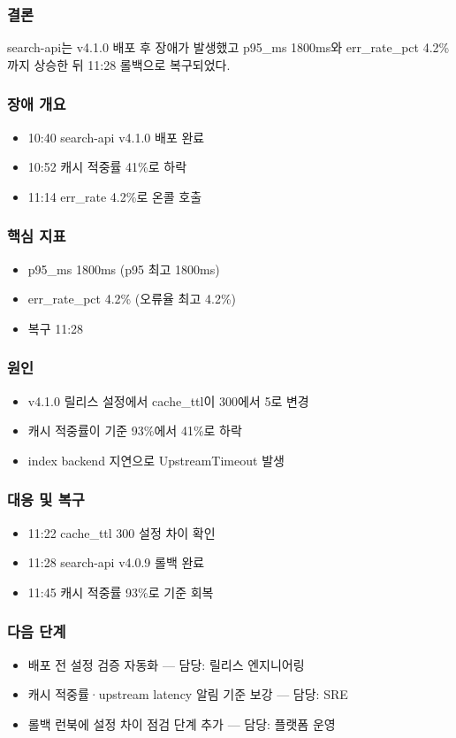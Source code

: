 \documentclass[aspectratio=169]{beamer}
\begin{document}
\begin{frame}
\frametitle{결론}
\centering
search-api는 v4.1.0 배포 후 장애가 발생했고 p95\_ms 1800ms와 err\_rate\_pct 4.2\%까지 상승한 뒤 11:28 롤백으로 복구되었다.
\end{frame}

\begin{frame}
\frametitle{장애 개요}
\begin{itemize}
  \item 10:40 search-api v4.1.0 배포 완료
  \item 10:52 캐시 적중률 41\%로 하락
  \item 11:14 err\_rate 4.2\%로 온콜 호출
\end{itemize}
\end{frame}

\begin{frame}
\frametitle{핵심 지표}
\begin{itemize}
  \item p95\_ms 1800ms (p95 최고 1800ms)
  \item err\_rate\_pct 4.2\% (오류율 최고 4.2\%)
  \item 복구 11:28
\end{itemize}
\end{frame}

\begin{frame}
\frametitle{원인}
\begin{itemize}
  \item v4.1.0 릴리스 설정에서 cache\_ttl이 300에서 5로 변경
  \item 캐시 적중률이 기준 93\%에서 41\%로 하락
  \item index backend 지연으로 UpstreamTimeout 발생
\end{itemize}
\end{frame}

\begin{frame}
\frametitle{대응 및 복구}
\begin{itemize}
  \item 11:22 cache\_ttl 300  설정 차이 확인
  \item 11:28 search-api v4.0.9 롤백 완료
  \item 11:45 캐시 적중률 93\%로 기준 회복
\end{itemize}
\end{frame}

\begin{frame}
\frametitle{다음 단계}
\begin{itemize}
  \item 배포 전 설정 검증 자동화 — 담당: 릴리스 엔지니어링
  \item 캐시 적중률·upstream latency 알림 기준 보강 — 담당: SRE
  \item 롤백 런북에 설정 차이 점검 단계 추가 — 담당: 플랫폼 운영
\end{itemize}
\end{frame}
\end{document}
